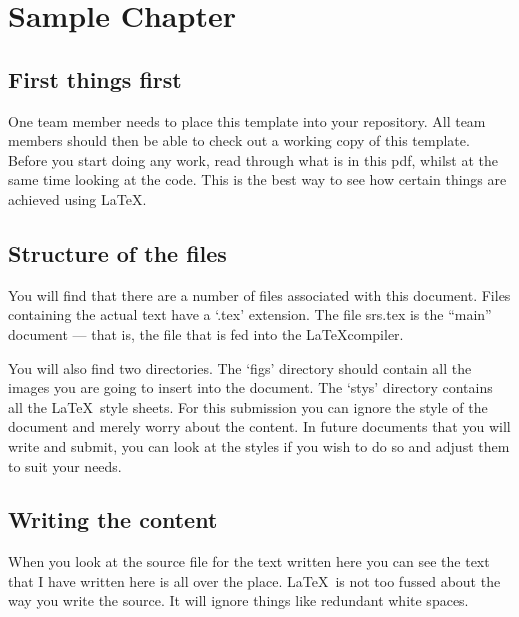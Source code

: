 
\chapter{Sample Chapter}

	\section{First things first}

One team member needs to place this template into your 
repository. All team members should then be able to check out a
working copy of this template. Before you start doing any work, read
through what is in this pdf, whilst at the same time looking at the
code. This is the best way to see how certain things are achieved
using \LaTeX.


	\section{Structure of the files}

You will find that there are a number of files associated with this
document. Files containing the actual text have a `.tex'
extension. The file srs.tex is the ``main'' document --- that is, the
file that is fed into the \LaTeX compiler.



You will also find two directories. The `figs' directory should
contain all the images you are going to insert into the document. The
`stys' directory contains all the \LaTeX~style sheets. For this
submission you can ignore the style of the document and merely worry
about the content. In future documents that you will write and submit,
you can look at the styles if you wish to do so and adjust them to
suit your needs.

\section{Writing the content}

When you look at the source file for the text written here you can see the text that I have    written here  is all over the   place. \LaTeX~is not too fussed about the way you write the source. It will ignore things like redundant white spaces.










